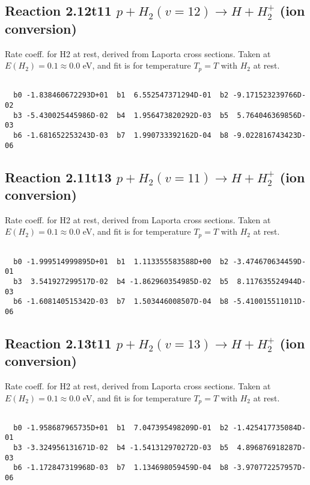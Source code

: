 \documentclass[12pt,dvipdfmx]{article}
\begin{document}
\newpage
\subsection{
Reaction 2.12t11
$ p + H_2(v=12) \rightarrow H + H_2^+$ (ion conversion)
}
Rate coeff. for H2 at rest, derived from Laporta cross sections.
Taken at $E(H_2) = 0.1 \approx 0.0$ eV,  and fit is for temperature $T_p=T$ with $H_2$ at rest.

\begin{small}\begin{verbatim}

  b0 -1.838460672293D+01  b1  6.552547371294D-01  b2 -9.171523239766D-02
  b3 -5.430025445986D-02  b4  1.956473820292D-03  b5  5.764046369856D-03
  b6 -1.681652253243D-03  b7  1.990733392162D-04  b8 -9.022816743423D-06

\end{verbatim}\end{small}

\newpage
\subsection{
Reaction 2.11t13
$ p + H_2(v=11) \rightarrow H + H_2^+$ (ion conversion)
}
Rate coeff. for H2 at rest, derived from Laporta cross sections.
Taken at $E(H_2) = 0.1 \approx 0.0$ eV,  and fit is for temperature $T_p=T$ with $H_2$ at rest.

\begin{small}\begin{verbatim}

  b0 -1.999514999895D+01  b1  1.113355583588D+00  b2 -3.474670634459D-01
  b3  3.541927299517D-02  b4 -1.862960354985D-02  b5  8.117635524944D-03
  b6 -1.608140515342D-03  b7  1.503446008507D-04  b8 -5.410015511011D-06

\end{verbatim}\end{small}

\newpage
\subsection{
Reaction 2.13t11
$ p + H_2(v=13) \rightarrow H + H_2^+$ (ion conversion)
}
Rate coeff. for H2 at rest, derived from Laporta cross sections.
Taken at $E(H_2) = 0.1 \approx 0.0$ eV,  and fit is for temperature $T_p=T$ with $H_2$ at rest.

\begin{small}\begin{verbatim}

  b0 -1.958687965735D+01  b1  7.047395498209D-01  b2 -1.425417735084D-01
  b3 -3.324956131671D-02  b4 -1.541312970272D-03  b5  4.896876918287D-03
  b6 -1.172847319968D-03  b7  1.134698059459D-04  b8 -3.970772257957D-06

\end{verbatim}\end{small}
\end{document}
